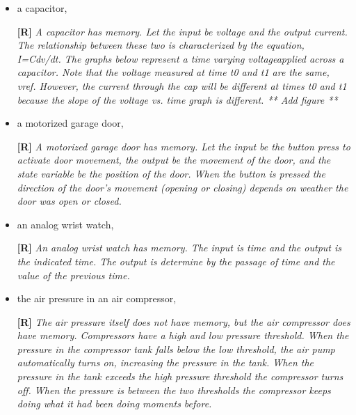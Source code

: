\begin{enumerate}
\begin{itemize}
    \item a capacitor,

      \begin{onlysolution}
        \textbf{[R]}
        \itshape
        A capacitor has memory. Let the input be voltage and the output current. The 
        relationship between these two is characterized by the equation, I=Cdv/dt. The graphs 
        below represent a time varying voltageapplied across a capacitor. Note that the voltage 
        measured at time t0 and t1 are the same, vref. However, the current through the cap will 
        be different at times t0 and t1 because the slope of the voltage vs. time graph is different.
        ** Add figure ** 
      \end{onlysolution}

    \item a motorized garage door,

      \begin{onlysolution}
        \textbf{[R]}
        \itshape
        A motorized garage door has memory. Let the input be the button press to activate door movement, 
        the output be the movement of the door, and the state variable be the position of the door. 
        When the button is pressed the direction of the door’s movement (opening or closing) depends 
        on weather the door was open or closed.
      \end{onlysolution}

    \item an analog wrist watch, 

      \begin{onlysolution}
        \textbf{[R]}
        \itshape
        An analog wrist watch has memory. The input is time and the output is the indicated time. The output 
        is determine by the passage of time and the value of the previous time.
      \end{onlysolution}

    \item the air pressure in an air compressor, 

      \begin{onlysolution}
        \textbf{[R]}
        \itshape
        The air pressure itself does not have memory, but the air compressor does have memory. Compressors have 
        a high and low pressure threshold. When the pressure in the compressor tank falls below the low threshold, 
        the air pump automatically turns on, increasing the pressure in the tank. When the pressure in the tank 
        exceeds the high pressure threshold the compressor turns off. When the pressure is between the two thresholds 
        the compressor keeps doing what it had been doing moments before.
      \end{onlysolution}


\end{itemize}
\end{enumerate}
